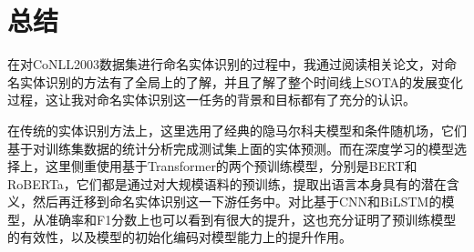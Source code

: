 \documentclass[a4paper, 12pt]{article}
\begin{document}

\section{总结}

在对CoNLL2003数据集进行命名实体识别的过程中，我通过阅读相关论文，对命名实体识别的方法有了全局上的了解，并且了解了整个时间线上SOTA的发展变化过程，这让我对命名实体识别这一任务的背景和目标都有了充分的认识。

在传统的实体识别方法上，这里选用了经典的隐马尔科夫模型和条件随机场，它们基于对训练集数据的统计分析完成测试集上面的实体预测。而在深度学习的模型选择上，这里侧重使用基于Transformer的两个预训练模型，分别是BERT和RoBERTa，它们都是通过对大规模语料的预训练，提取出语言本身具有的潜在含义，然后再迁移到命名实体识别这一下游任务中。对比基于CNN和BiLSTM的模型，从准确率和F1分数上也可以看到有很大的提升，这也充分证明了预训练模型的有效性，以及模型的初始化编码对模型能力上的提升作用。


% 
% 
\end{document}
